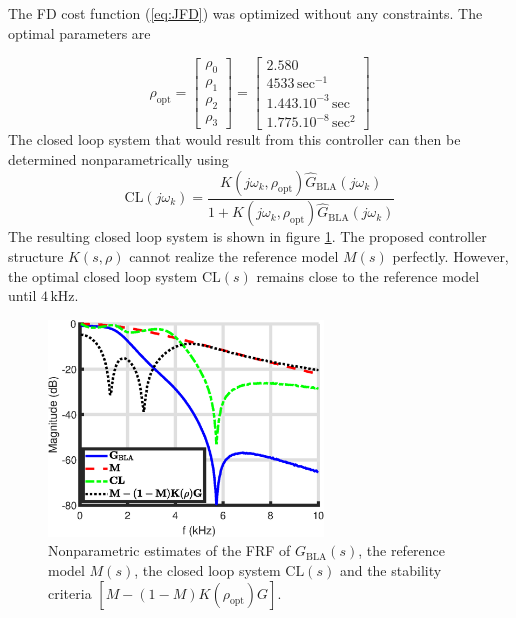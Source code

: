 The FD cost function (\ref{eq:JFD}) was optimized without any constraints. The optimal parameters are

\begin{equation*} \rho_{\mathrm{opt}} = 
\begin{bmatrix}
\rho_0\\\rho_1\\\rho_2\\\rho_3
\end{bmatrix} = 
\begin{bmatrix}
2.580\\4533 \, \textrm{sec}^{-1}\\1.443 . 10^{-3} \, \textrm{sec}\\1.775 . 10^{-8} \, \textrm{sec}^{2}
\end{bmatrix}
\end{equation*}
The closed loop system that would result from this controller can then be determined nonparametrically using
\begin{equation}
	\mathrm{CL}(j\omega_k) = \frac{K(j\omega_k, \rho_{\mathrm{opt}}) \hat G_{\mathrm{BLA}}(j\omega_k)}{1 + K(j\omega_k, \rho_{\mathrm{opt}}) \hat G_{\mathrm{BLA}}(j\omega_k)}
	\label{eq:optimal_CL}
\end{equation}
The resulting closed loop system is shown in figure \ref{fig:GBLA_M_CL_nonparam}. The proposed controller structure $K(s,\rho)$ cannot realize the reference model $M(s)$ perfectly. However, the optimal closed loop system $\mathrm{CL}(s)$ remains close to the reference model until $4 \, \mathrm{kHz}$. 

\begin{figure}[H]
\centering
\includegraphics[width = 0.65\textwidth]{figures/real_system_nonparametric_closed_loop.eps}
\caption{Nonparametric estimates of the FRF of $G_{\mathrm{BLA}}(s)$, the reference model $M(s)$, the closed loop system $\mathrm{CL}(s)$ and the stability criteria $[M - (1-M)K(\rho_{\mathrm{opt}})G]$.}
\label{fig:GBLA_M_CL_nonparam}
\end{figure}

